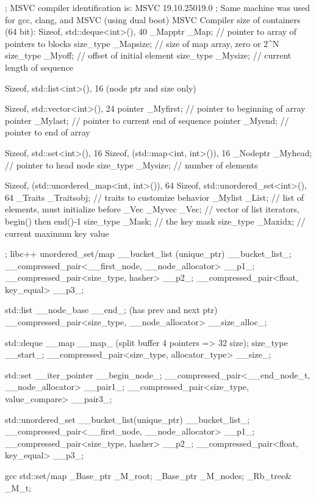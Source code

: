 \documentclass{sig-alternate}
\begin{document}
; MSVC compiler identification is:  MSVC 19.10.25019.0
; Same machine was used for gcc, clang, and MSVC (using dual boot)
MSVC Compiler size of containers (64 bit):
Sizeof, std::deque<int>(), 40
	_Mapptr _Map;		// pointer to array of pointers to blocks
	size_type _Mapsize;	// size of map array, zero or 2^N
	size_type _Myoff;	// offset of initial element
	size_type _Mysize;	// current length of sequence


Sizeof, std::list<int>(), 16
 (node ptr and size only)

Sizeof, std::vector<int>(), 24
	pointer _Myfirst;	// pointer to beginning of array
	pointer _Mylast;	// pointer to current end of sequence
	pointer _Myend;	// pointer to end of array

Sizeof, std::set<int>(), 16
Sizeof, (std::map<int, int>()), 16
	_Nodeptr _Myhead;	// pointer to head node
	size_type _Mysize;	// number of elements


Sizeof, (std::unordered_map<int, int>()), 64
Sizeof, std::unordered_set<int>(), 64
	_Traits _Traitsobj;	// traits to customize behavior
	_Mylist _List;	// list of elements, must initialize before _Vec
	_Myvec _Vec;	// vector of list iterators, begin() then end()-1
	size_type _Mask;	// the key mask
	size_type _Maxidx;	// current maximum key value


; libc++
unordered_set/map
__bucket_list (unique_ptr)                            __bucket_list_;
__compressed_pair<__first_node, __node_allocator>     __p1_;
__compressed_pair<size_type, hasher>                  __p2_;
__compressed_pair<float, key_equal>                   __p3_;

std::list
__node_base __end_; (has prev and next ptr)
__compressed_pair<size_type, __node_allocator> __size_alloc_;

std::deque
__map __map_ (split buffer 4 pointers => 32 size);
size_type __start_;
__compressed_pair<size_type, allocator_type> __size_;

std::set
    __iter_pointer                                     __begin_node_;
    __compressed_pair<__end_node_t, __node_allocator>  __pair1_;
    __compressed_pair<size_type, value_compare>        __pair3_;

std::unordered_set
    __bucket_list(unique_ptr)                             __bucket_list_;
    __compressed_pair<__first_node, __node_allocator>     __p1_;
    __compressed_pair<size_type, hasher>                  __p2_;
    __compressed_pair<float, key_equal>                   __p3_;


gcc
std::set/map
        _Base_ptr _M_root;
        _Base_ptr _M_nodes;
        _Rb_tree& _M_t;
\end{document}
